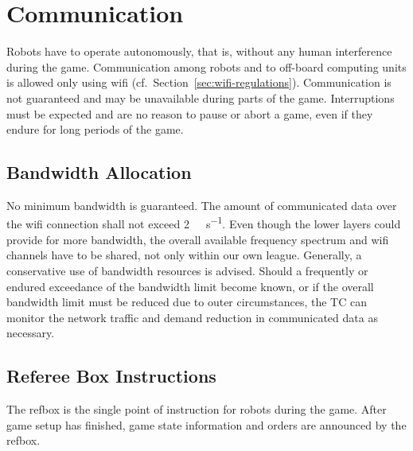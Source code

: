 \documentclass[12pt,twoside]{article}
\newcommand{\refsec}[1]{Section~\ref{#1}}
\begin{document}

\section{Communication}
\label{sec:communication}

Robots have to operate autonomously, that is, without any human
interference during the game. Communication among robots and to
off-board computing units is allowed only using wifi
(cf.~\refsec{sec:wifi-regulations}). Communication is not guaranteed
and may be unavailable during parts of the game. Interruptions must be
expected and are no reason to pause or abort a game, even if they
endure for long periods of the game.

\subsection{Bandwidth Allocation}
\label{sec:bandwidth}
No minimum bandwidth is guaranteed. The amount of communicated data
over the wifi connection shall not exceed
\SI[per-mode=symbol]{2}{\mega\bit\per\second}. Even though the lower
layers could provide for more bandwidth, the overall available
frequency spectrum and wifi channels have to be shared, not only
within our own league. Generally, a conservative use of bandwidth
resources is advised. Should a frequently or endured exceedance of the
bandwidth limit become known, or if the overall bandwidth limit must
be reduced due to outer circumstances, the TC can monitor the network
traffic and demand reduction in communicated data as necessary.

\subsection{Referee Box Instructions}
\label{sec:referee-box}
The refbox is the single point of instruction for robots during the
game. After game setup has finished, game state information and orders
are announced by the refbox.
\end{document}
